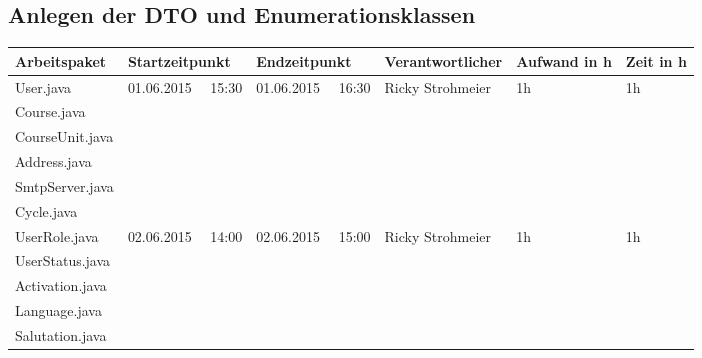 \begin{landscape}
	
	\subsection{Anlegen der DTO und Enumerationsklassen}
	\begin{tabular}{|p{10.3cm}|p{3.2cm}|p{3.2cm}|p{3.5cm}|p{1.7cm}|p{1.5cm}|}
		\hline  \textbf{Arbeitspaket} & \textbf{Startzeitpunkt} & \textbf{Endzeitpunkt} & \textbf{Verantwortlicher}  & \textbf{Aufwand in h} & \textbf{Zeit in h}\\ 
		\hline   User.java                  & 01.06.2015 \ \ 15:30       & 01.06.2015 \ \ 16:30     & Ricky Strohmeier & 1h          &   1h\\ 
		Course.java                      &                            &                             &             &        &\\ 
		CourseUnit.java                  &                            &                             &             &        &\\ 
		Address.java                     &                            &                             &             &        &\\ 
		SmtpServer.java                  &                            &                             &             &        &\\  
		Cycle.java                       &                            &                             &             &        &\\   
		\hline UserRole.java               & 02.06.2015 \ \ 14:00       & 02.06.2015 \ \  15:00     & Ricky Strohmeier & 1h          &   1h\\ 
		UserStatus.java             &                            &                             &             &       &\\ 
		Activation.java             &                            &                             &             &       &\\ 
		Language.java               &                            &                             &             &       &\\ 
		Salutation.java             &                            &                             &             &       &\\ 
		\hline 
	\end{tabular} \ \\
	\ \\
	

\end{landscape}
